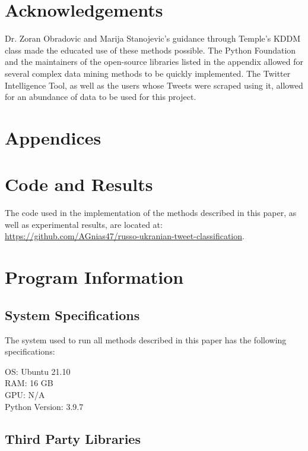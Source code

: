 \documentclass[12pt,letterpaper,oneside,titlepage]{article}
\begin{document}
\section{Acknowledgements}\label{sec:acknowledgements}

Dr. Zoran Obradovic and Marija Stanojevic's guidance through Temple's KDDM class made the educated use of these methods possible. 
The Python Foundation and the maintainers of the open-source libraries listed in the appendix allowed for several 
complex data mining methods to be quickly implemented. 
The Twitter Intelligence Tool, as well as the users whose Tweets were scraped using it, allowed for an abundance of data to be used for this project.

\pagebreak

\printbibliography

\pagebreak

\section*{Appendices}

\appendix

\section{Code and Results}

The code used in the implementation of the methods described in this paper, as well as experimental results,
are located at: \\
\url{https://github.com/AGnias47/russo-ukranian-tweet-classification}.

\section{Program Information}

\subsection{System Specifications}

The system used to run all methods described in this paper has the following specifications:

OS: Ubuntu 21.10 \\
RAM: 16 GB \\
GPU: N/A \\
Python Version: 3.9.7

\subsection{Third Party Libraries}
\end{document}
